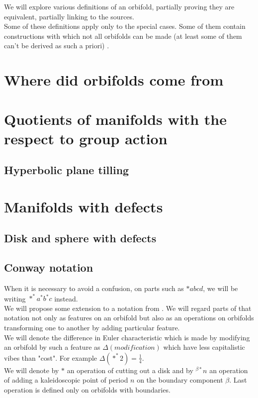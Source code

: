 We will explore various definitions of an orbifold, partially proving they are equivalent, partially 
linking to the sources. \\
Some of these definitions apply only to the special cases. Some of them contain constructions 
with which not all orbifolds can be made (at least some of them can't be derived as such a priori)
. \\

\section{Where did orbifolds come from}


\section{Quotients of manifolds with the respect to group action}
\subsection{Hyperbolic plane tilling}

\section{Manifolds with defects}
\subsection{Disk and sphere with defects}\label{Disk_and_sphere_with_defects}



\subsection{Conway notation}
\cite{Conway2008}

When it is necessary to avoid a confusion, on parts such as $*abcd$, we will be writing 
$*^*a^*b^*c$ instead. \\
We will propose some extension to a notation from \cite{Conway2008}.
We will regard parts of that notation not only as features on an orbifold but also as an operations 
on orbifolds transforming one to another by adding particular feature. \\
We will denote the difference in Euler characteristic which is made by modifying 
an orbifold by such a feature as $\Delta(modification)$ 
which have less capitalistic vibes than "cost". 
For example $\Delta(*^*2) = \frac{1}{4}$. \\
We will denote by $*$ an operation of cutting out a disk and by $^{\beta*}n$ an operation of 
adding a kaleidoscopic point of period $n$ on the boundary component $\beta$. 
Last operation is defined only on orbifolds with boundaries.


